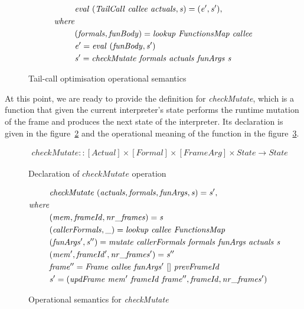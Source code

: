 \documentclass[diploma]{softlab-thesis}
\begin{document}
\begin{figure}[h]
  \begin{align*}
    & \mathit{eval \hfill\ (TailCall \hfill\ callee \hfill\ actuals, s) = (e', s'),} \\
    \mathit{where} \\
    & \mathit{(formals, funBody) = lookup \hfill\ FunctionsMap \hfill\ callee} \\
    & \mathit{e' = eval \hfill\ (funBody, s')} \\
    & \mathit{s' = checkMutate \hfill\ formals \hfill\ actuals \hfill\ funArgs \hfill\ s} 
  \end{align*}
\caption{Tail-call optimisation operational semantics \label{fig:tco}}
\end{figure}


At this point, we are ready to provide the definition for \textit{checkMutate}, which 
is a function that given the current interpreter's state performs the runtime mutation 
of the frame and produces the next state of the interpreter. Its declaration is given in 
the figure~\ref{fig:checkdecl} and the operational meaning of the function in the 
figure~\ref{fig:checkMutate}.

\begin{figure}[h]
  \begin{align*}
    \mathit{checkMutate :: [Actual] \times [Formal] \times [FrameArg] \times State \rightarrow State} 
  \end{align*}
\caption{Declaration of $\mathit{checkMutate}$ operation\label{fig:checkdecl}}
\end{figure}

 

\begin{figure}[h]
  \begin{align*}
    & \mathit{checkMutate \hfill\ (actuals, formals, funArgs, s) = s', } \\
    \mathit{where } \\
    & \mathit{(mem, frameId, nr\_frames) = s} \\
    & \mathit{(callerFormals, \_) = lookup \hfill\ callee \hfill\ FunctionsMap} \\
    & \mathit{(funArgs', s'') = mutate \hfill\ callerFormals \hfill\ formals \hfill\ funArgs \hfill\ actuals \hfill\ s } \\
    & \mathit{(mem', frameId', nr\_frames') = s''} \\
    & \mathit{frame'' = Frame \hfill\ callee \hfill\ funArgs' \hfill\ [] \hfill\ prevFrameId} \\
    & \mathit{s' = (updFrame \hfill\ mem' \hfill\ frameId \hfill\ frame'', frameId, nr\_frames')}
  \end{align*}
\caption{Operational semantics for \textit{checkMutate}\label{fig:checkMutate}}
\end{figure}
\end{document}
